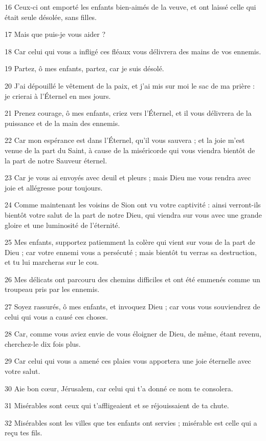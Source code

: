 \par 16 Ceux-ci ont emporté les enfants bien-aimés de la veuve, et ont laissé celle qui était seule désolée, sans filles.
\par 17 Mais que puis-je vous aider ?
\par 18 Car celui qui vous a infligé ces fléaux vous délivrera des mains de vos ennemis.
\par 19 Partez, ô mes enfants, partez, car je suis désolé.
\par 20 J'ai dépouillé le vêtement de la paix, et j'ai mis sur moi le sac de ma prière : je crierai à l'Éternel en mes jours.
\par 21 Prenez courage, ô mes enfants, criez vers l'Éternel, et il vous délivrera de la puissance et de la main des ennemis.
\par 22 Car mon espérance est dans l'Éternel, qu'il vous sauvera ; et la joie m'est venue de la part du Saint, à cause de la miséricorde qui vous viendra bientôt de la part de notre Sauveur éternel.
\par 23 Car je vous ai envoyés avec deuil et pleurs ; mais Dieu me vous rendra avec joie et allégresse pour toujours.
\par 24 Comme maintenant les voisins de Sion ont vu votre captivité : ainsi verront-ils bientôt votre salut de la part de notre Dieu, qui viendra sur vous avec une grande gloire et une luminosité de l'éternité.
\par 25 Mes enfants, supportez patiemment la colère qui vient sur vous de la part de Dieu ; car votre ennemi vous a persécuté ; mais bientôt tu verras sa destruction, et tu lui marcheras sur le cou.
\par 26 Mes délicats ont parcouru des chemins difficiles et ont été emmenés comme un troupeau pris par les ennemis.
\par 27 Soyez rassurés, ô mes enfants, et invoquez Dieu ; car vous vous souviendrez de celui qui vous a causé ces choses.
\par 28 Car, comme vous aviez envie de vous éloigner de Dieu, de même, étant revenu, cherchez-le dix fois plus.
\par 29 Car celui qui vous a amené ces plaies vous apportera une joie éternelle avec votre salut.
\par 30 Aie bon cœur, Jérusalem, car celui qui t'a donné ce nom te consolera.
\par 31 Misérables sont ceux qui t'affligeaient et se réjouissaient de ta chute.
\par 32 Misérables sont les villes que tes enfants ont servies ; misérable est celle qui a reçu tes fils.
